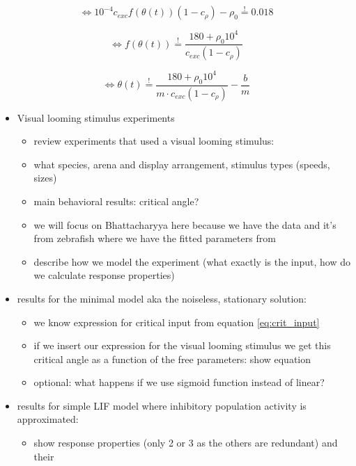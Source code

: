 \documentclass[a4paper,10pt,hidelinks]{scrreprt}
\begin{document}
	\begin{equation}
	\Leftrightarrow 10^{-4} c_{exc} f(\theta(t)) (1 - c_{\rho}) - \rho_{0} 
	\overset{!}{=} 0.018
	\end{equation}
	
	\begin{equation}
	\Leftrightarrow f(\theta(t)) \overset{!}{=} \frac{180 + \rho_{0}10^{4}} 
	{c_{exc}(1 - c_{\rho})}
	\end{equation}
	
	\begin{equation}
	\Leftrightarrow \theta(t) \overset{!}{=} \frac{180 + \rho_{0}10^{4}} 
	{m \cdot c_{exc}(1 - c_{\rho})} - \frac{b}{m}
	\end{equation}
	\begin{itemize}
		\item Visual looming stimulus experiments
		\begin{itemize}
			\item review experiments that used a visual looming stimulus:
			\item what species, arena and display arrangement, stimulus types (speeds, sizes)
			\item main behavioral results: critical angle?
			\item we will focus on Bhattacharyya here because we have the data and it's from 
			zebrafish where we have the fitted parameters from \cite{Koyama2016}
			\item describe how we model the experiment (what exactly is the input, how do we 
			calculate response properties)
		\end{itemize}
		\item results for the minimal model aka the noiseless, stationary solution:
		\begin{itemize}
			\item we know expression for critical input from equation \ref{eq:crit_input}
			\item if we insert our expression for the visual looming stimulus we get this critical 
			angle as a function of the free parameters: show equation
			\item optional: what happens if we use sigmoid function instead of linear?
		\end{itemize}
		\item results for simple LIF model where inhibitory population activity is approximated:
		\begin{itemize}
			\item show response properties (only 2 or 3 as the others are redundant) and their 

\end{itemize}
\end{itemize}
\end{document}
